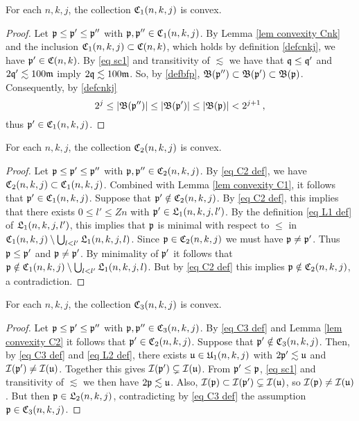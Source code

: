 \begin{lemma}
    \label{lem convexity C1}
    For each $n,k,j$, the collection $\mathfrak C_1(n,k,j)$ is convex.
\end{lemma}

\begin{proof}
    Let $\mathfrak p\le\mathfrak p'\le\mathfrak p''$ with $\mathfrak p, \mathfrak p'' \in \mathfrak C_1(n,k,j)$. By Lemma \ref{lem convexity Cnk} and the inclusion $\mathfrak C_1(n,k,j) \subset \mathfrak C(n,k)$, which holds by definition \eqref{defcnkj}, we have $\mathfrak p' \in \mathfrak C(n,k)$. By \eqref{eq sc1} and transitivity of $\lesssim$ we have that $\mathfrak q \le \mathfrak q'$ and $2 \mathfrak q' \lesssim 100\mathfrak{m}$ imply $2\mathfrak q \lesssim 100\mathfrak{m}$. So, by \eqref{defbfp}, $\mathfrak{B}(\mathfrak p'') \subset \mathfrak{B}(\mathfrak p') \subset \mathfrak{B}(\mathfrak p)$. Consequently, by \eqref{defcnkj}
    $$
        2^j \le |\mathfrak{B}(\mathfrak p'')|\le |\mathfrak{B}(\mathfrak p')| \le |\mathfrak{B}(\mathfrak p)| < 2^{j+1}\,,
    $$
    thus $\mathfrak p' \in \mathfrak C_1(n,k,j)$.
\end{proof}

\begin{lemma}
    \label{lem convexity C2}
    For each $n,k,j$, the collection $\mathfrak C_2(n,k,j)$ is convex.
\end{lemma}

\begin{proof}
        Let $\mathfrak p \le \mathfrak p' \le \mathfrak p''$ with $\mathfrak p, \mathfrak p'' \in \mathfrak C_2(n,k,j)$. By \eqref{eq C2 def}, we have $\mathfrak C_2(n,k,j) \subset \mathfrak C_1(n,k,j)$. Combined with Lemma \ref{lem convexity C1}, it follows that $\mathfrak p' \in \mathfrak C_1(n,k,j)$. Suppose that $\mathfrak p' \notin \mathfrak C_2(n,k,j)$. By \eqref{eq C2 def}, this implies that there exists $0 \le l' \le Zn$  with $\mathfrak p' \in \mathfrak L_1(n,k,j,l')$. By the definition \eqref{eq L1 def} of $\mathfrak L_1(n,k,j,l')$, this implies that $\mathfrak p$ is minimal with respect to $\le$  in $\mathfrak C_1(n,k,j) \setminus \bigcup_{l < l'} \mathfrak L_1(n,k,j,l)$. Since $\mathfrak p \in \mathfrak C_2(n,k,j)$ we must have $\mathfrak p \ne \mathfrak p'$. Thus $\mathfrak p \le \mathfrak p'$ and $\mathfrak p \ne \mathfrak p'$. By minimality of $\mathfrak p'$ it follows that $\mathfrak p \notin \mathfrak C_1(n,k,j) \setminus \bigcup_{l < l'} \mathfrak L_1(n,k,j,l)$. But by \eqref{eq C2 def} this implies $\mathfrak p \notin \mathfrak C_2(n,k,j)$, a contradiction.
\end{proof}

\begin{lemma}
    \label{lem convexity C3}
    For each $n,k,j$, the collection $\mathfrak C_3(n,k,j)$ is convex.
\end{lemma}

\begin{proof}
    Let $\mathfrak p \le \mathfrak p' \le \mathfrak p''$ with $\mathfrak p, \mathfrak p'' \in \mathfrak C_3(n,k,j)$. By \eqref{eq C3 def} and Lemma \ref{lem convexity C2} it follows that $\mathfrak p' \in \mathfrak C_2(n,k,j)$. Suppose that $\mathfrak p' \notin \mathfrak C_3(n,k,j)$. Then, by \eqref{eq C3 def} and \eqref{eq L2 def}, there exists $\mathfrak u \in \mathfrak U_1(n,k,j)$ with $2\mathfrak p' \lesssim \mathfrak u$ and $\mathcal{I}(\mathfrak p') \ne \mathcal{I}(\mathfrak u)$. Together this gives $\mathcal{I}(\mathfrak p') \subsetneq \mathcal{I}(\mathfrak u)$. From $\mathfrak p' \le \mathfrak p$, \eqref{eq sc1} and transitivity of $\lesssim$ we then have $2\mathfrak p \lesssim \mathfrak u$. Also, $\mathcal{I}(\mathfrak p) \subset \mathcal{I}(\mathfrak p') \subsetneq \mathcal{I}(\mathfrak u)$, so $\mathcal{I}(\mathfrak p) \ne \mathcal{I}(\mathfrak u)$. But then $\mathfrak p \in \mathfrak L_2(n,k,j)$, contradicting by \eqref{eq C3 def} the assumption $\mathfrak p \in \mathfrak C_3(n,k,j)$.
\end{proof}

